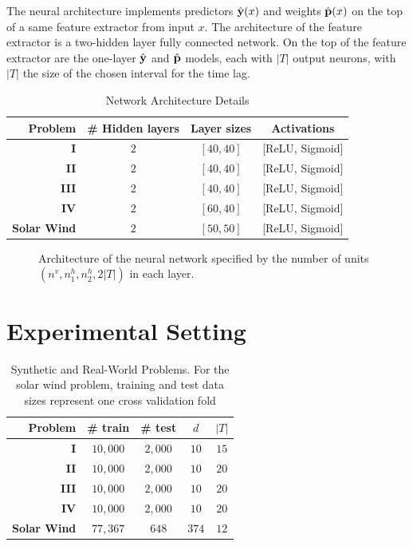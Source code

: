 The neural architecture implements predictors $\hat {\bf y}(x)$ and weights $\hat {\bf p}(x)$ on 
the top of a same feature extractor from input $x$. The architecture of the feature extractor is a 
two-hidden layer fully connected network. On the top of the feature extractor are the 
one-layer $\hat {\bf y}$ and $\hat {\bf p}$ models, each with $|T|$ output neurons, with $|T|$ the 
size of the chosen interval for the time lag.

\begin{table}[htbp]
  \caption{Network Architecture Details}\label{tab:arch_probs}
  \centering
  \begin{tabular}{ r c c c }
  \hline
  Problem &  \# Hidden layers & Layer sizes & Activations\\
  \hline
  \textbf{I} & $2$ & $[40, 40]$  & [ReLU, Sigmoid]\\
  \textbf{II} & $2$ & $[40, 40]$ & [ReLU, Sigmoid]\\
  \textbf{III} & $2$ & $[40, 40]$ & [ReLU, Sigmoid]\\
  \textbf{IV} & $2$ & $[60, 40]$ & [ReLU, Sigmoid]\\
  \textbf{Solar Wind} & $2$ & $[50, 50]$ & [ReLU, Sigmoid]\\
  \hline
  \end{tabular}
\end{table}


\begin{figure}[ht]
\centerline{\resizebox*{0.7\textwidth}{!}{}}
\caption{\label{fig:archi} Architecture of the neural network specified by the number of units 
$(n^v,n_1^h,n_2^h,2\vert T\vert)$ in each layer.}
\label{fig:NN}
\end{figure}

\section{Experimental Setting}\label{sec:pdtExp}

\begin{table}[ht]
  \caption{
    Synthetic and Real-World Problems. 
    For the solar wind problem, training and test data sizes represent one cross validation fold}
  \label{tab:exp_data_info}
  \centering
  \begin{tabular}{ r c c c c}
  \hline
  Problem &  \# train & \# test & $d$ & $|T|$ \\
  \hline
  \textbf{I} & $10,000$ & $2,000$  & $10$ & $15$\\
  \textbf{II} & $10,000$ & $2,000$ & $10$ & $20$\\
  \textbf{III} & $10,000$ & $2,000$ & $10$ & $20$\\
  \textbf{IV} & $10,000$ & $2,000$ & $10$ & $20$\\
  \textbf{Solar Wind} & $77,367$ & $648$ & $374$ & $12$\\
  \hline
  \end{tabular}
\end{table}

